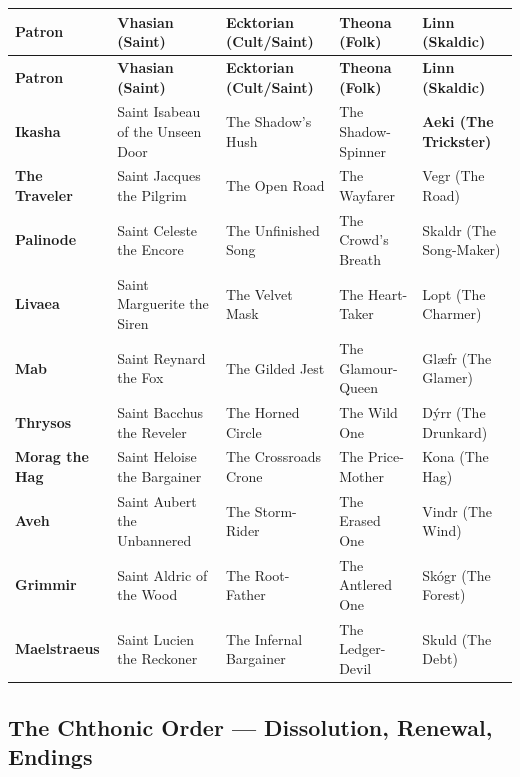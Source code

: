 \begin{longtable}{p{3cm}|p{2.8cm}|p{2.8cm}|p{2.8cm}|p{2.8cm}}
\toprule
\textbf{Patron} & \textbf{Vhasian (Saint)} & \textbf{Ecktorian (Cult/Saint)} & \textbf{Theona (Folk)} & \textbf{Linn (Skaldic)} \\
\midrule
\endfirsthead
\toprule
\textbf{Patron} & \textbf{Vhasian (Saint)} & \textbf{Ecktorian (Cult/Saint)} & \textbf{Theona (Folk)} & \textbf{Linn (Skaldic)} \\
\midrule
\endhead
\bottomrule
\endfoot
\textbf{Ikasha} & Saint Isabeau of the Unseen Door & The Shadow's Hush & The Shadow-Spinner & \textbf{Aeki (The Trickster)} \\
\textbf{The Traveler} & Saint Jacques the Pilgrim & The Open Road & The Wayfarer & Vegr (The Road) \\
\textbf{Palinode} & Saint Celeste the Encore & The Unfinished Song & The Crowd's Breath & Skaldr (The Song-Maker) \\
\textbf{Livaea} & Saint Marguerite the Siren & The Velvet Mask & The Heart-Taker & Lopt (The Charmer) \\
\textbf{Mab} & Saint Reynard the Fox & The Gilded Jest & The Glamour-Queen & Glæfr (The Glamer) \\
\textbf{Thrysos} & Saint Bacchus the Reveler & The Horned Circle & The Wild One & Dýrr (The Drunkard) \\
\textbf{Morag the Hag} & Saint Heloise the Bargainer & The Crossroads Crone & The Price-Mother & Kona (The Hag) \\
\textbf{Aveh} & Saint Aubert the Unbannered & The Storm-Rider & The Erased One & Vindr (The Wind) \\
\textbf{Grimmir} & Saint Aldric of the Wood & The Root-Father & The Antlered One & Skógr (The Forest) \\
\textbf{Maelstraeus} & Saint Lucien the Reckoner & The Infernal Bargainer & The Ledger-Devil & Skuld (The Debt) \\
\bottomrule
\end{longtable}

\subsection{The Chthonic Order --- Dissolution, Renewal, Endings}

